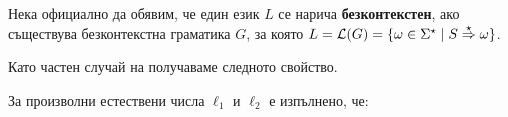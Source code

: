 

Нека официално да обявим, че един език $L$ се нарича {\bf безконтекстен}, ако съществува безконтекстна граматика $G$, за която 
$L = \L(G) = \{\omega \in \Sigma^\star \mid S \derive{\star} \omega\}$.

Като частен случай на  получаваме следното свойство.
\begin{proposition}\label{pr:context-free-grammar:context-general-step}
  За произволни естествени числа $\ell_1$ и $\ell_2$ е изпълнено, че:
  \begin{prooftree}
  \end{prooftree}  
\end{proposition}

